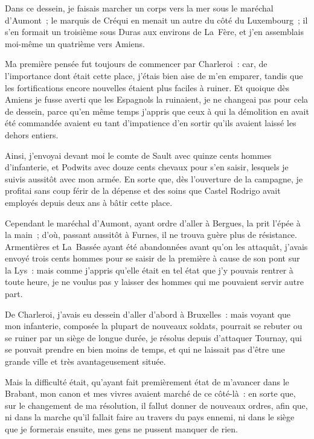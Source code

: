 \documentclass[french,twoside]{book} %
\begin{document}
Dans ce dessein, je faisais marcher un corps vers la mer sous le maréchal d’Aumont ; le marquis de Créqui en menait un autre du côté du Luxembourg ; il s’en formait un troisième sous Duras aux environs de La Fère, et j’en assemblais moi-même un quatrième vers Amiens.\par
Ma première pensée fut toujours de commencer par Charleroi : car, de l’importance dont était cette place, j’étais bien aise de m’en emparer, tandis que les fortifications encore nouvelles étaient plus faciles à ruiner. Et quoique dès Amiens je fusse averti que les Espagnols la ruinaient, je ne changeai pas pour cela de dessein, parce qu’en même temps j’appris que ceux à qui la démolition en avait été commandée avaient eu tant d’impatience d’en sortir qu’ils avaient laissé les dehors entiers.\par
Ainsi, j’envoyai devant moi le comte de Sault avec quinze cents hommes d’infanterie, et Podwits avec douze cents chevaux pour s’en saisir, lesquels je suivis aussitôt avec mon armée. En sorte que, dès l’ouverture de la campagne, je profitai sans coup férir de la dépense et des soins que Castel Rodrigo avait employés depuis deux ans à bâtir cette place.\par
Cependant le maréchal d’Aumont, ayant ordre d’aller à Bergues, la prit l’épée à la main ; d’où, passant aussitôt à Furnes, il ne trouva guère plus de résistance. Armentières et La Bassée ayant été abandonnées avant qu’on les attaquât, j’avais envoyé trois cents hommes pour se saisir de la première à cause de son pont sur la Lys : mais comme j’appris qu’elle était en tel état que j’y pouvais rentrer à toute heure, je ne voulus pas y laisser des hommes qui me pouvaient servir autre part.\par
De Charleroi, j’avais eu dessein d’aller d’abord à Bruxelles : mais voyant que mon infanterie, composée la plupart de nouveaux soldats, pourrait se rebuter ou se ruiner par un siège de longue durée, je résolus depuis d’attaquer Tournay, qui se pouvait prendre en bien moins de temps, et qui ne laissait pas d’être une grande ville et très avantageusement située.\par
Mais la difficulté était, qu’ayant fait premièrement état de m’avancer dans le Brabant, mon canon et mes vivres avaient marché de ce côté-là : en sorte que, sur le changement de ma résolution, il fallut donner de nouveaux ordres, afin que, ni dans la marche qu’il fallait faire au travers du pays ennemi, ni dans le siège que je formerais ensuite, mes gens ne pussent manquer de rien.\par
\end{document}
